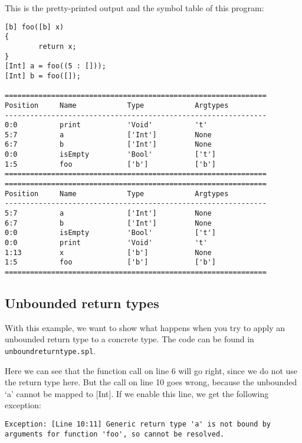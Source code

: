 \documentclass[a4paper]{article}
\begin{document}
This is the pretty-printed output and the symbol table of this program: 
\begin{verbatim}
[b] foo([b] x)
{
        return x;
}
[Int] a = foo((5 : []));
[Int] b = foo([]);

==============================================================
Position     Name            Type            Argtypes            
--------------------------------------------------------------
0:0          print           'Void'          't'                 
5:7          a               ['Int']         None                
6:7          b               ['Int']         None                
0:0          isEmpty         'Bool'          ['t']               
1:5          foo             ['b']           ['b']               
==============================================================
==============================================================
Position     Name            Type            Argtypes            
--------------------------------------------------------------
5:7          a               ['Int']         None                
6:7          b               ['Int']         None                
0:0          isEmpty         'Bool'          ['t']               
0:0          print           'Void'          't'                 
1:13         x               ['b']           None                
1:5          foo             ['b']           ['b']               
==============================================================
\end{verbatim}

\subsection{Unbounded return types}
With this example, we want to show what happens when you try to apply an unbounded return type to a concrete type. The code can be found in {\tt unboundreturntype.spl}. 

Here we can see that the function call on line 6 will go right, since we do not use the return type here. But the call on line 10 goes wrong, because the unbounded `a' cannot be mapped to [Int]. If we enable this line, we get the following exception: 

\begin{verbatim}
Exception: [Line 10:11] Generic return type 'a' is not bound by arguments for function 'foo', so cannot be resolved.
\end{verbatim}
\end{document}
